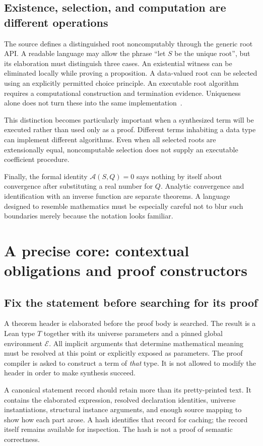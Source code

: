 \documentclass[11pt,letterpaper]{article}
\theoremstyle{definition}
\theoremstyle{remark}
\begin{document}
\subsection{Existence, selection, and computation are different operations}
The source defines a distinguished root noncomputably through the generic root API. A readable language may allow the phrase ``let $S$ be the unique root'', but its elaboration must distinguish three cases. An existential witness can be eliminated locally while proving a proposition. A data-valued root can be selected using an explicitly permitted choice principle. An executable root algorithm requires a computational construction and termination evidence. Uniqueness alone does not turn these into the same implementation~\cite{germ,lean-axioms}.

This distinction becomes particularly important when a synthesized term will be executed rather than used only as a proof. Different terms inhabiting a data type can implement different algorithms. Even when all selected roots are extensionally equal, noncomputable selection does not supply an executable coefficient procedure.

Finally, the formal identity $\mathcal A(S,Q)=0$ says nothing by itself about convergence after substituting a real number for $Q$. Analytic convergence and identification with an inverse function are separate theorems. A language designed to resemble mathematics must be especially careful not to blur such boundaries merely because the notation looks familiar.

\section{A precise core: contextual obligations and proof constructors}
\label{sec:semantics}
\subsection{Fix the statement before searching for its proof}
A theorem header is elaborated before the proof body is searched. The result is a Lean type $T$ together with its universe parameters and a pinned global environment $\mathcal E$. All implicit arguments that determine mathematical meaning must be resolved at this point or explicitly exposed as parameters. The proof compiler is asked to construct a term of \emph{that} type. It is not allowed to modify the header in order to make synthesis succeed.

A canonical statement record should retain more than its pretty-printed text. It contains the elaborated expression, resolved declaration identities, universe instantiations, structural instance arguments, and enough source mapping to show how each part arose. A hash identifies that record for caching; the record itself remains available for inspection. The hash is not a proof of semantic correctness.
\end{document}
